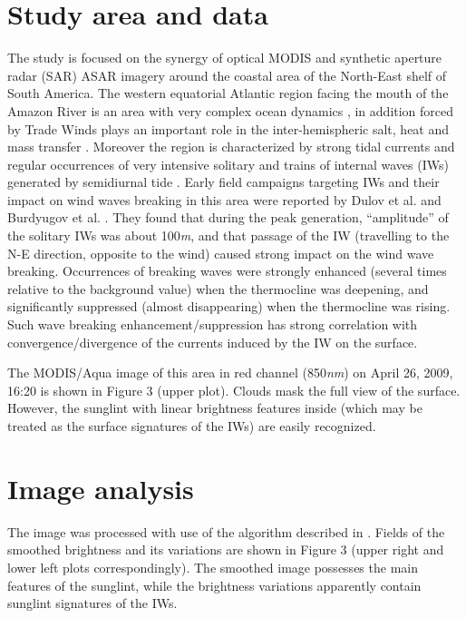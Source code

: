 \documentclass[draft,grl]{agutex}
\begin{document}
\begin{article}
\section{Study area and data}

The study is focused on the synergy of optical MODIS and synthetic aperture radar (SAR) ASAR imagery around the coastal area of the North-East shelf of South America. The western equatorial Atlantic region facing the mouth of the Amazon River is an area with very complex ocean dynamics \citep{Silva2010}, in addition forced by Trade Winds \citep{Augustinus2004} plays an important role in the inter-hemispheric salt, heat and mass transfer \citep{Dengler2004, Schmitz1993}. Moreover the region is characterized by strong tidal currents \citep{Oltman1968, RockwellGeyer1996, LeBars2010} and regular occurrences of very intensive solitary and trains of internal waves (IWs) generated by semidiurnal tide \citep{Burdyugov1987, Ivanov1993}. Early field campaigns targeting IWs and their impact on wind waves breaking in this area were reported by Dulov et al. \citep{Dulov1986}  and Burdyugov et al. \citep{Burdyugov1987}. They found that during the peak generation, ``amplitude'' of the solitary IWs was about 100\textit{m}, and that passage of the IW (travelling to the N-E direction, opposite to the wind) caused strong impact on the wind wave breaking.  Occurrences of breaking waves were strongly enhanced (several times relative to the background value) when the thermocline was deepening, and significantly suppressed (almost disappearing) when the thermocline was rising. Such wave breaking enhancement/suppression has strong correlation with convergence/divergence of the currents induced by the IW on the surface.

The MODIS/Aqua image of this area in red channel (850\textit{nm}) on April 26, 2009, 16:20 is shown in Figure 3 (upper plot). Clouds mask the full view of the surface. However, the sunglint with linear brightness features inside (which may be treated as the surface signatures of the IWs) are easily recognized.


\section{Image analysis}

The image was processed with use of the algorithm described in \citep{Kudryavtsev2012a}. Fields of the smoothed brightness  and its variations  are shown in Figure 3 (upper right and lower left plots correspondingly). The smoothed image possesses the main features of the sunglint, while the brightness variations apparently contain sunglint signatures of the IWs.


\end{article}
\end{document}
